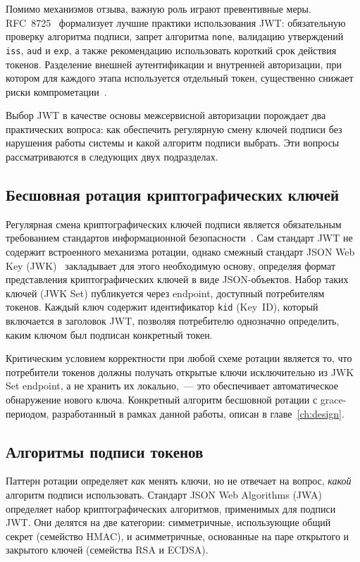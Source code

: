 Помимо механизмов отзыва, важную роль играют превентивные меры.
RFC~8725~\cite{RFC8725} формализует лучшие практики использования JWT:
обязательную проверку алгоритма подписи,
запрет алгоритма \texttt{none},
валидацию утверждений \texttt{iss}, \texttt{aud} и \texttt{exp},
а также рекомендацию использовать короткий срок действия токенов.
Разделение внешней аутентификации и внутренней авторизации,
при котором для каждого этапа используется отдельный токен,
существенно снижает риски компрометации~\cite{Vencauskas2023}.

Выбор JWT в качестве основы межсервисной авторизации
порождает два практических вопроса:
как обеспечить регулярную смену ключей подписи без нарушения работы системы
и какой алгоритм подписи выбрать.
Эти вопросы рассматриваются в следующих двух подразделах.

\subsection{Бесшовная ротация криптографических ключей}\label{subsec:key-rotation}

Регулярная смена криптографических ключей подписи
является обязательным требованием стандартов информационной безопасности~\cite{GOST27001}.
Сам стандарт JWT не содержит встроенного механизма ротации,
однако смежный стандарт JSON Web Key (JWK)~\cite{RFC7517}
закладывает для этого необходимую основу,
определяя формат представления криптографических ключей в виде JSON-объектов.
Набор таких ключей (JWK Set) публикуется через endpoint,
доступный потребителям токенов.
Каждый ключ содержит идентификатор \texttt{kid} (Key~ID),
который включается в заголовок JWT,
позволяя потребителю однозначно определить,
каким ключом был подписан конкретный токен.

Критическим условием корректности при любой схеме ротации является то,
что потребители токенов должны получать открытые ключи
исключительно из JWK Set endpoint, а не хранить их локально,~---
это обеспечивает автоматическое обнаружение нового ключа.
Конкретный алгоритм бесшовной ротации с grace-периодом,
разработанный в рамках данной работы,
описан в главе~\ref{ch:design}.

\subsection{Алгоритмы подписи токенов}\label{subsec:signing-algorithms}

Паттерн ротации определяет \emph{как} менять ключи,
но не отвечает на вопрос, \emph{какой} алгоритм подписи использовать.
Стандарт JSON Web Algorithms (JWA)~\cite{RFC7518} определяет набор
криптографических алгоритмов, применимых для подписи JWT.
Они делятся на две категории:
симметричные, использующие общий секрет (семейство HMAC),
и асимметричные, основанные на паре открытого и закрытого ключей
(семейства RSA и ECDSA).

